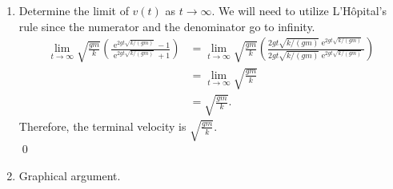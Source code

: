 \documentclass[10pt]{amsart}
\DeclareMathOperator{\E}{e}
\theoremstyle{nonumberplain}
\begin{document}
\begin{enumerate}[label={\bf {\arabic*}:}]
\begin{enumerate}
\begin{align*}
\log \left( \frac {1 + \sqrt{k/(gm)} \: v}{1 - \sqrt{k/(gm)} \: v}\right) 
	 &= 2 g t \sqrt{k/(gm)}.
\end{align*}
Now we can exponentiate and solve for $v$
\begin{align*}
\frac {1 + \sqrt{k/(gm)} \: v}{1 - \sqrt{k/(gm)} \: v}
	 &= \E^{2 g t \sqrt{k/(gm)}} \\
1 + \sqrt{k/(gm)} \: v
	 &= \E^{2 g t \sqrt{k/(gm)}}(1 - \sqrt{k/(gm)} \: v) \\
1 + \sqrt{k/(gm)} \: v 
	 &= \E^{2 g t \sqrt{k/(gm)}} - \sqrt{k/(gm)} \: v \E^{2 g t \sqrt{k/(gm)}} \\
\sqrt{k/(gm)} \: v +  \sqrt{k/(gm)} \: v \E^{2 g t \sqrt{k/(gm)}}
	 &= \E^{2 g t \sqrt{k/(gm)}} - 1 \\
v &= \frac {\E^{2 g t \sqrt{k/(gm)}} - 1}{\sqrt{k/(gm)} +  \sqrt{k/(gm)} \E^{2 g t \sqrt{k/(gm)}}}.
\end{align*}
Some final simplifications gives us
\begin{align*}
v &= \frac 1 {\sqrt{k/(gm)}}\frac {\E^{2 g t \sqrt{k/(gm)}} - 1}{1 +  \E^{2 g t \sqrt{k/(gm)}}} \\
v &= \sqrt{\frac {gm}{k}} \left( \frac {\E^{2 g t \sqrt{k/(gm)}} - 1}{\E^{2 g t \sqrt{k/(gm)}}+ 1} \right).
\end{align*}
Therefore our final analytical solution is 
$$
v = \sqrt{\frac {gm}{k}} \left( \frac {\E^{2 g t \sqrt{k/(gm)}} - 1}{\E^{2 g t \sqrt{k/(gm)}}+ 1} \right).
$$
\qed \\

\item Determine the limit of $v(t)$ as $t\rightarrow \infty$.
We will need to utilize L'Hôpital's rule since the numerator and the denominator go to infinity.
\begin{align*}
\lim_{t\rightarrow \infty} \sqrt{\frac {gm}{k}} \left( \frac {\E^{2 g t \sqrt{k/(gm)}} - 1}{\E^{2 g t \sqrt{k/(gm)}}+ 1} \right)
	&= \lim_{t\rightarrow \infty} \sqrt{\frac {gm}{k}} \left( \frac {2 g t \sqrt{k/(gm)}\E^{2 g t \sqrt{k/(gm)}}}{2 g t \sqrt{k/(gm)}\E^{2 g t \sqrt{k/(gm)}}} \right) \\
	&= \lim_{t\rightarrow \infty} \sqrt{\frac {gm}{k}} \\
	&= \sqrt{\frac {gm}{k}}.
\end{align*}
Therefore, the terminal velocity is $\sqrt{\frac {gm}{k}}$. \\
\qed \\

\newpage

\item Graphical argument. \\


\end{enumerate}
\end{enumerate}
\end{document}
